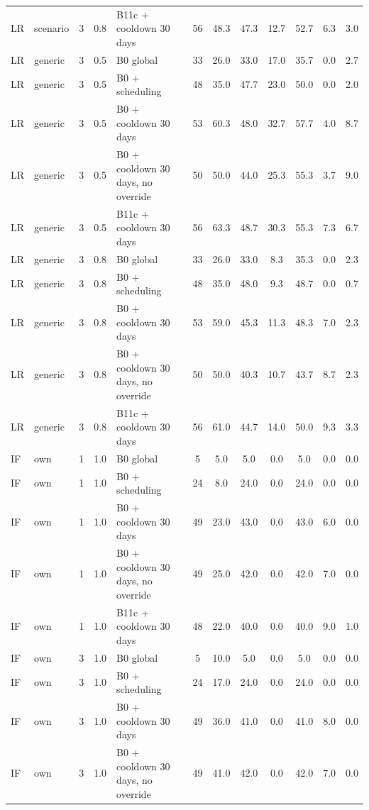\begin{longtable}{lllllccccccc}
LR & scenario & 3 & 0.8 & B11c + cooldown 30 days & 56 & 48.3 & 47.3 & 12.7 & 52.7 & 6.3 & 3.0 \\
LR & generic & 3 & 0.5 & B0 global & 33 & 26.0 & 33.0 & 17.0 & 35.7 & 0.0 & 2.7 \\
LR & generic & 3 & 0.5 & B0 + scheduling & 48 & 35.0 & 47.7 & 23.0 & 50.0 & 0.0 & 2.0 \\
LR & generic & 3 & 0.5 & B0 + cooldown 30 days & 53 & 60.3 & 48.0 & 32.7 & 57.7 & 4.0 & 8.7 \\
LR & generic & 3 & 0.5 & B0 + cooldown 30 days, no override & 50 & 50.0 & 44.0 & 25.3 & 55.3 & 3.7 & 9.0 \\
LR & generic & 3 & 0.5 & B11c + cooldown 30 days & 56 & 63.3 & 48.7 & 30.3 & 55.3 & 7.3 & 6.7 \\
LR & generic & 3 & 0.8 & B0 global & 33 & 26.0 & 33.0 & 8.3 & 35.3 & 0.0 & 2.3 \\
LR & generic & 3 & 0.8 & B0 + scheduling & 48 & 35.0 & 48.0 & 9.3 & 48.7 & 0.0 & 0.7 \\
LR & generic & 3 & 0.8 & B0 + cooldown 30 days & 53 & 59.0 & 45.3 & 11.3 & 48.3 & 7.0 & 2.3 \\
LR & generic & 3 & 0.8 & B0 + cooldown 30 days, no override & 50 & 50.0 & 40.3 & 10.7 & 43.7 & 8.7 & 2.3 \\
LR & generic & 3 & 0.8 & B11c + cooldown 30 days & 56 & 61.0 & 44.7 & 14.0 & 50.0 & 9.3 & 3.3 \\
IF & own & 1 & 1.0 & B0 global & 5 & 5.0 & 5.0 & 0.0 & 5.0 & 0.0 & 0.0 \\
IF & own & 1 & 1.0 & B0 + scheduling & 24 & 8.0 & 24.0 & 0.0 & 24.0 & 0.0 & 0.0 \\
IF & own & 1 & 1.0 & B0 + cooldown 30 days & 49 & 23.0 & 43.0 & 0.0 & 43.0 & 6.0 & 0.0 \\
IF & own & 1 & 1.0 & B0 + cooldown 30 days, no override & 49 & 25.0 & 42.0 & 0.0 & 42.0 & 7.0 & 0.0 \\
IF & own & 1 & 1.0 & B11c + cooldown 30 days & 48 & 22.0 & 40.0 & 0.0 & 40.0 & 9.0 & 1.0 \\
IF & own & 3 & 1.0 & B0 global & 5 & 10.0 & 5.0 & 0.0 & 5.0 & 0.0 & 0.0 \\
IF & own & 3 & 1.0 & B0 + scheduling & 24 & 17.0 & 24.0 & 0.0 & 24.0 & 0.0 & 0.0 \\
IF & own & 3 & 1.0 & B0 + cooldown 30 days & 49 & 36.0 & 41.0 & 0.0 & 41.0 & 8.0 & 0.0 \\
IF & own & 3 & 1.0 & B0 + cooldown 30 days, no override & 49 & 41.0 & 42.0 & 0.0 & 42.0 & 7.0 & 0.0 \\

\end{longtable}
